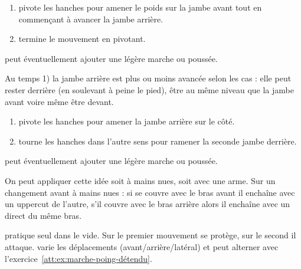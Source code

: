 \begin{technique}
\label{att:tech:changement-garde-2-temps-avant}

\begin{enumerate}
	\item \A pivote les hanches pour amener le poids sur la jambe avant tout en commençant à avancer la jambe arrière.
	
	\item \A termine le mouvement en pivotant.
\end{enumerate}

\A peut éventuellement ajouter une légère marche ou poussée.

Au temps 1) la jambe arrière est plus ou moins avancée selon les cas : elle peut rester derrière (en soulevant à peine le pied), être au même niveau que la jambe avant voire même être devant.
\end{technique}


\begin{technique}
\label{att:tech:changement-garde-2-temps-latéral}

\begin{enumerate}
	\item \A pivote les hanches pour amener la jambe arrière sur le côté.
	
	\item \A tourne les hanches dans l'autre sens pour ramener la seconde jambe derrière.
\end{enumerate}

\A peut éventuellement ajouter une légère marche ou poussée.
\end{technique}


On peut appliquer cette idée soit à mains nues, soit avec une arme.
Sur un changement avant à mains nues : si \A se couvre avec le bras avant il enchaîne avec un uppercut de l'autre, s'il couvre avec le bras arrière alors il enchaîne avec un direct du même bras.


\begin{exercice}
\label{att:ex:changement-garde-2-temps-vide}

\A pratique seul dans le vide.
Sur le premier mouvement \A se protège, sur le second il attaque.
\A varie les déplacements (avant/arrière/latéral) et peut alterner avec l'exercice~\ref{att:ex:marche-poing-détendu}.
\end{exercice}



